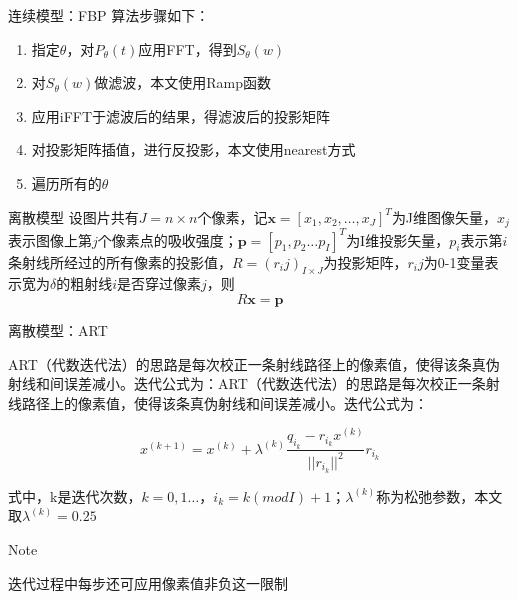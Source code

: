 \documentclass[serif]{beamer} %
\begin{document}
  
  
\begin{frame}{连续模型：FBP} 
	算法步骤如下：  
	\begin{enumerate}
		\item 指定$\theta$，对\(P_\theta (t)\)应用FFT，得到\(S_\theta (w)\)
		        
		\item 对\(S_\theta (w)\)做滤波，本文使用Ramp函数
		        
		\item 应用iFFT于滤波后的结果，得滤波后的投影矩阵
		        
		\item 对投影矩阵插值，进行反投影，本文使用nearest方式
		        
		\item 遍历所有的$\theta$    
	\end{enumerate}
\end{frame}
  
  
\begin{frame}{离散模型}  
	设图片共有\(J = n\times n\)个像素，记$\textbf{x}=[x_{1},x_{2} ,\ldots ,x_{J}]^T$为J维图像矢量，\(x_j\)表示图像上第\(j\)个像素点的吸收强度；$\textbf{p}=[p_{1},p_{2} \ldots p_{I}]^T$为I维投影矢量，$p_i$表示第\(i\)条射线所经过的所有像素的投影值，$R=(r_ij)_{I\times J}$为投影矩阵，\(r_ij\)为0-1变量表示宽为\(\delta\)的粗射线\(i\)是否穿过像素\(j\)，则	  
	\begin{equation}
		R\textbf{x}=\textbf{p}
	\end{equation}
\end{frame}
  
  
  
\begin{frame}{离散模型：ART}
	  
	ART（代数迭代法）的思路是每次校正一条射线路径上的像素值，使得该条真伪射线和间误差减小。迭代公式为：ART（代数迭代法）的思路是每次校正一条射线路径上的像素值，使得该条真伪射线和间误差减小。迭代公式为：
	  
	\begin{equation}
		x^{(k+1)}=x^{(k)}+\lambda^{(k)}\frac{q_{i_{k}}-r_{i_{k}}x^{(k)}}{||r_{i_{k}}||^{2}}r_{i_{k}}
	\end{equation}
	  
	式中，k是迭代次数，$k=0,1 \ldots$，$i_{k}=k(modI)+1$；$\lambda^{(k)}$称为松弛参数，本文取$\lambda^{(k)}=0.25$
	  
	\begin{alertblock}{Note}
		  
		迭代过程中每步还可应用像素值非负这一限制
		  
	\end{alertblock}
	  
\end{frame}
  
\end{document}
